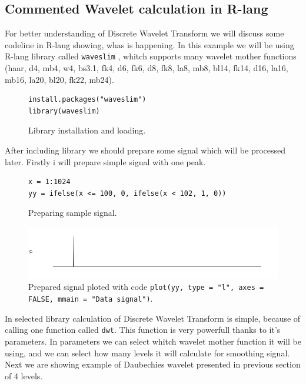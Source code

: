 \documentclass{article}
\begin{document}
\subsection{Commented Wavelet calculation in R-lang}

For better understanding of Discrete Wavelet Transform we will discuss some codeline in R-lang showing, whas is happening.
In this example we will be using R-lang library called \texttt{waveslim} \cite{brandonwhitcher2019}, whitch supports many wavelet mother functions (haar, d4, mb4, w4, bs3.1, fk4, d6, fk6, d8, fk8, la8, mb8, bl14, fk14, d16, la16, mb16, la20, bl20, fk22, mb24).

\begin{figure}[h!]
\begin{lstlisting}
install.packages("waveslim")
library(waveslim)
\end{lstlisting}
\caption{Library installation and loading.}
\label{code:library}
\end{figure}

After including library we should prepare some signal which will be processed later. Firstly i will prepare simple signal with one peak.

\pagebreak

\begin{figure}[h!]
\begin{lstlisting}
x = 1:1024
yy = ifelse(x <= 100, 0, ifelse(x < 102, 1, 0))
\end{lstlisting}
\caption{Preparing sample signal.}
\label{code:samples}
\end{figure}

\begin{figure}[h!]
\centering
\includegraphics[scale=0.55]{basic-signal.png}
\caption{Prepared signal ploted with code \texttt{plot(yy, type = "l", axes = FALSE, mmain = "Data signal")}.}
\label{fig:sample-signal}
\end{figure}

In selected library calculation of Discrete Wavelet Transform is simple, because of calling one function called \texttt{dwt}. This function is very powerfull thanks to it's parameters. In parameters we can select whitch wavelet mother function it will be using, and we can select how many levels it will calculate for smoothing signal. Next we are showing example of Daubechies wavelet presented in previous section of 4 levels.
\end{document}
